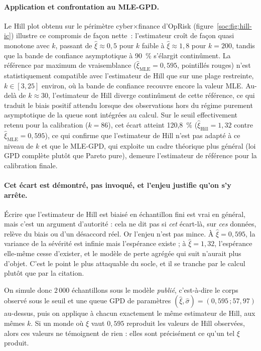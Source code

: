 \paragraph{Application et confrontation au MLE-GPD.} Le Hill plot obtenu sur
le périmètre cyber$\times$finance d'OpRisk (figure~\ref{soc:fig:hill-ic})
illustre ce compromis de façon nette~: l'estimateur croît de façon quasi
monotone avec $k$, passant de $\hat{\xi} \approx 0{,}5$ pour $k$ faible à
$\hat{\xi} \approx 1{,}8$ pour $k = 200$, tandis que la bande de confiance
asymptotique à 90~\% s'élargit continûment. La référence par maximum de
vraisemblance ($\hat{\xi}_{\text{MLE}} = 0{,}595$, pointillés rouges) n'est
statistiquement compatible avec l'estimateur de Hill que sur une plage
restreinte, $k \in [3, 25]$ environ, où la bande de confiance recouvre
encore la valeur MLE. Au-delà de $k \approx 30$, l'estimateur de Hill
diverge continûment de cette référence, ce qui traduit le biais positif
attendu lorsque des observations hors du régime purement asymptotique de la
queue sont intégrées au calcul. Sur le seuil effectivement retenu pour la
calibration ($k = 86$), cet écart atteint 120{,}8~\%
($\hat{\xi}_{\text{Hill}} = 1{,}32$ contre $\hat{\xi}_{\text{MLE}} = 0{,}595$),
ce qui confirme que l'estimateur de Hill n'est pas adapté à ce niveau de
$k$ et que le MLE-GPD, qui exploite un cadre théorique plus général
(loi GPD complète plutôt que Pareto pure), demeure l'estimateur de
référence pour la calibration finale.

\paragraph{Cet écart est démontré, pas invoqué, et l'enjeu justifie qu'on s'y arrête.}
Écrire que l'estimateur de Hill est biaisé en échantillon fini est vrai en général, mais c'est
un argument d'autorité : cela ne dit pas si \emph{cet} écart-là, sur \emph{ces} données, relève
du biais ou d'un désaccord réel. Or l'enjeu n'est pas mince. À $\hat\xi = 0{,}595$, la variance
de la sévérité est infinie mais l'espérance existe ; à $\hat\xi = 1{,}32$, l'espérance elle-même
cesse d'exister, et le modèle de perte agrégée qui suit n'aurait plus d'objet. C'est le point le
plus attaquable du socle, et il se tranche par le calcul plutôt que par la citation.

On simule donc $2\,000$ échantillons sous le modèle \emph{publié}, c'est-à-dire le corps observé
sous le seuil et une queue GPD de paramètres $(\hat\xi,\hat\sigma) = (0{,}595\,;57{,}97)$
au-dessus, puis on applique à chacun exactement le même estimateur de Hill, aux mêmes $k$. Si un
monde où $\xi$ vaut $0{,}595$ reproduit les valeurs de Hill observées, alors ces valeurs ne
témoignent de rien : elles sont précisément ce qu'un tel $\xi$ produit.

